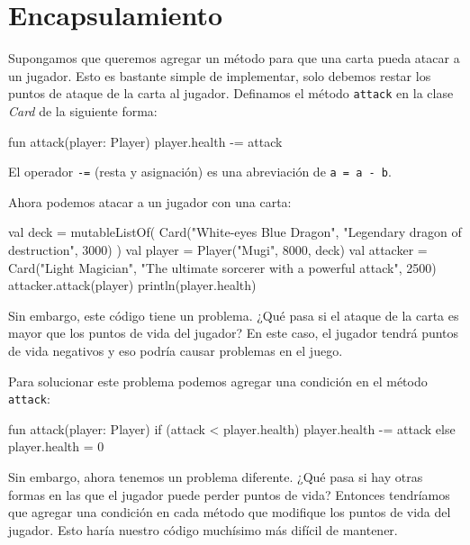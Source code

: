
\section{Encapsulamiento}
  Supongamos que queremos agregar un método para que una carta pueda atacar a un jugador.
  Esto es bastante simple de implementar, solo debemos restar los puntos de ataque de la carta
  al jugador.
  Definamos el método \texttt{attack} en la clase \textit{Card} de la siguiente forma:

  \begin{kotlin}
    fun attack(player: Player) {
      player.health -= attack
    }
  \end{kotlin}

  \begin{note}
    El operador \texttt{-=} (resta y asignación) es una abreviación de \texttt{a = a - b}.
  \end{note}

  Ahora podemos atacar a un jugador con una carta:

  \begin{kotlin}
    val deck = mutableListOf(
      Card("White-eyes Blue Dragon", "Legendary dragon of destruction", 3000)
    )
    val player = Player("Mugi", 8000, deck)
    val attacker = 
      Card("Light Magician", "The ultimate sorcerer with a powerful attack", 2500)
    attacker.attack(player)
    println(player.health)
  \end{kotlin}

  Sin embargo, este código tiene un problema.
  ¿Qué pasa si el ataque de la carta es mayor que los puntos de vida del jugador?
  En este caso, el jugador tendrá puntos de vida negativos y eso podría causar problemas en el
  juego.

  Para solucionar este problema podemos agregar una condición en el método \texttt{attack}:

  \begin{kotlin}
    fun attack(player: Player) {
      if (attack < player.health) {
        player.health -= attack
      } else {
        player.health = 0
      }
    }
  \end{kotlin}

  Sin embargo, ahora tenemos un problema diferente.
  ¿Qué pasa si hay otras formas en las que el jugador puede perder puntos de vida?
  Entonces tendríamos que agregar una condición en cada método que modifique los puntos de vida
  del jugador.
  Esto haría nuestro código muchísimo más difícil de mantener.

